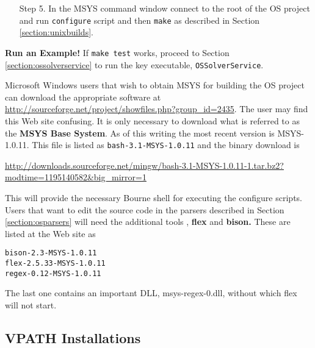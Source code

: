 \documentclass[11pt]{article}
\renewcommand{\_}{{\char"5F}}
\renewcommand{\{}{{\char"7B}}
\renewcommand{\}}{{\char"7D}}
\renewcommand{\^}{{\char"0D}}
\renewcommand{\'}{{\char"0D}}
\begin{document}
\begin{itemize}
\begin{verbatim}
INCLUDE=C:\Program Files\Microsoft Visual Studio 8\VC\INCLUDE;
C:\Program Files\Microsoft Platform SDK for Windows Server 2003 R2\Include

LIB = C:\Program Files\Microsoft Visual Studio 8\VC\LIB;
C:\Program Files\Microsoft Visual Studio 8\SDK\v2.0\lib;
C:\Program Files\Microsoft Platform SDK for Windows Server 2003 R2\Lib
\end{verbatim}

The environment variables can be set using the {\tt System Properties} in the Windows {\tt Control Panel}.


\item[Step 5.]  In the MSYS command window connect to the root of the OS project and run  {\tt configure}  script  and then {\tt make} as described in Section \ref{section:unixbuilds}.

\end{itemize}






{\bf Run an Example!}  If {\tt make test} works, proceed to Section \ref{section:ossolverservice} to run the key executable, {\tt OSSolverService}.


Microsoft Windows users that wish to obtain MSYS for building the OS project can download the appropriate software at \url{http://sourceforge.net/project/showfiles.php?group_id=2435}.  The user may find this Web site confusing.   It is only necessary to  download what is referred to as the {\bf MSYS Base System}.  As of this writing the most recent version is MSYS-1.0.11.  This file is listed as {\tt bash-3.1-MSYS-1.0.11} and the  binary download is 

{\small
\url{http://downloads.sourceforge.net/mingw/bash-3.1-MSYS-1.0.11-1.tar.bz2?modtime=1195140582&big_mirror=1}
}

This will provide the necessary Bourne shell for executing the configure scripts.  
Users that want to edit the source code in the parsers described in Section  \ref{section:osparsers} will need the additional  tools , {\bf flex} and {\bf bison.}  These are listed at the Web site as

\begin{verbatim}
bison-2.3-MSYS-1.0.11
flex-2.5.33-MSYS-1.0.11
regex-0.12-MSYS-1.0.11
\end{verbatim}
The last one contains an important DLL, msys-regex-0.dll, without which flex
will not start. 



\subsection{VPATH Installations}
\end{document}
